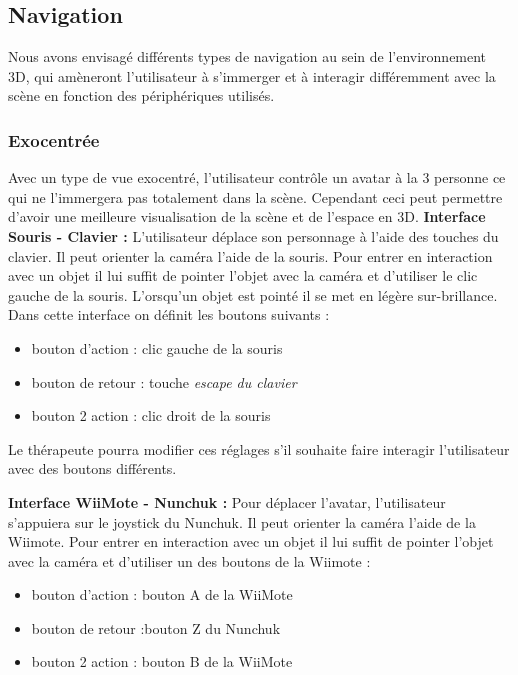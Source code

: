 \subsection{Navigation}
Nous avons envisagé différents types de navigation au sein de l’environnement 3D, qui amèneront l’utilisateur à s’immerger et à interagir différemment avec la scène en fonction des périphériques utilisés.

\subsubsection{Exocentrée}
Avec un type de vue exocentré, l’utilisateur contrôle un avatar à la 3 personne ce qui ne l’immergera pas totalement dans la scène. Cependant ceci peut permettre d'avoir une meilleure visualisation de la scène et de l'espace en 3D.
\newline
\textbf{Interface Souris - Clavier : }
L’utilisateur déplace son personnage à l’aide des touches du clavier. Il peut orienter la caméra l’aide de la souris. Pour entrer en interaction avec un objet il lui suffit de pointer l’objet avec la caméra et d’utiliser le clic gauche de la souris. L'orsqu'un objet est pointé il se met en légère sur-brillance. 
Dans cette interface on définit les boutons suivants :
	\begin{itemize}\renewcommand{\labelitemi}{$\bullet$}
  				\item bouton d’action : clic gauche de la souris
				 \item bouton de retour : touche \em{escape} du clavier
  				\item  bouton 2 action : clic droit de la souris
			\end{itemize}
Le thérapeute pourra modifier ces réglages s'il souhaite faire interagir l'utilisateur avec des boutons différents.
\newline


\textbf{Interface WiiMote - Nunchuk : }
Pour déplacer l’avatar, l’utilisateur s'appuiera sur le joystick du Nunchuk. Il peut orienter la caméra l’aide de la Wiimote. Pour entrer en interaction avec un objet il lui suffit de pointer l’objet avec la caméra et d’utiliser un des boutons de la Wiimote :
	\begin{itemize}\renewcommand{\labelitemi}{$\bullet$}
  				\item bouton d’action : bouton A de la WiiMote
				 \item bouton de retour :bouton Z du Nunchuk
  				\item  bouton 2 action : bouton B de la WiiMote
			\end{itemize}

